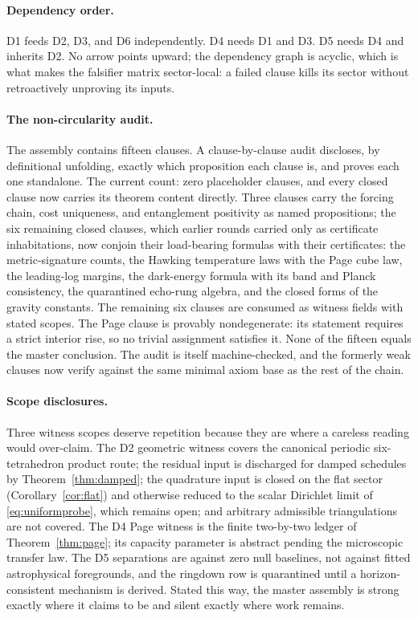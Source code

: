 \documentclass[11pt,letterpaper]{article}
\theoremstyle{definition}
\begin{document}
\paragraph{Dependency order.}
D1 feeds D2, D3, and D6 independently.  D4 needs D1 and D3.  D5 needs
D4 and inherits D2.  No arrow points upward; the dependency graph is
acyclic, which is what makes the falsifier matrix sector-local: a
failed clause kills its sector without retroactively unproving its
inputs.

\paragraph{The non-circularity audit.}
The assembly contains fifteen clauses.  A clause-by-clause audit
discloses, by definitional unfolding, exactly which proposition each
clause is, and proves each one standalone.  The current count: zero
placeholder clauses, and every closed clause now carries its theorem
content directly.  Three clauses carry the forcing chain, cost
uniqueness, and entanglement positivity as named propositions; the six
remaining closed clauses, which earlier rounds carried only as
certificate inhabitations, now conjoin their load-bearing formulas
with their certificates: the metric-signature counts, the Hawking
temperature laws with the Page cube law, the leading-log margins, the
dark-energy formula with its band and Planck consistency, the
quarantined echo-rung algebra, and the closed forms of the gravity
constants.  The remaining
six clauses are consumed as witness fields with stated scopes.  The Page clause is provably nondegenerate: its statement
requires a strict interior rise, so no trivial assignment satisfies
it.  None of the fifteen equals the master conclusion.  The audit is
itself machine-checked, and the formerly weak clauses now verify
against the same minimal axiom base as the rest of the chain.

\paragraph{Scope disclosures.}
Three witness scopes deserve repetition because they are where a
careless reading would over-claim.  The D2 geometric witness covers
the canonical periodic six-tetrahedron product route; the residual
input is discharged for damped schedules by Theorem~\ref{thm:damped};
the quadrature input is closed on the flat sector
(Corollary~\ref{cor:flat}) and otherwise reduced to the scalar
Dirichlet limit of \eqref{eq:uniformprobe}, which remains open; and
arbitrary admissible triangulations are not covered.  The D4 Page witness is the
finite two-by-two ledger of Theorem~\ref{thm:page}; its capacity
parameter is abstract pending the microscopic transfer law.  The D5
separations are against zero null baselines, not against fitted
astrophysical foregrounds, and the ringdown row is quarantined until a
horizon-consistent mechanism is derived.  Stated this way, the master
assembly is strong exactly where it claims to be and silent exactly
where work remains.
\end{document}
